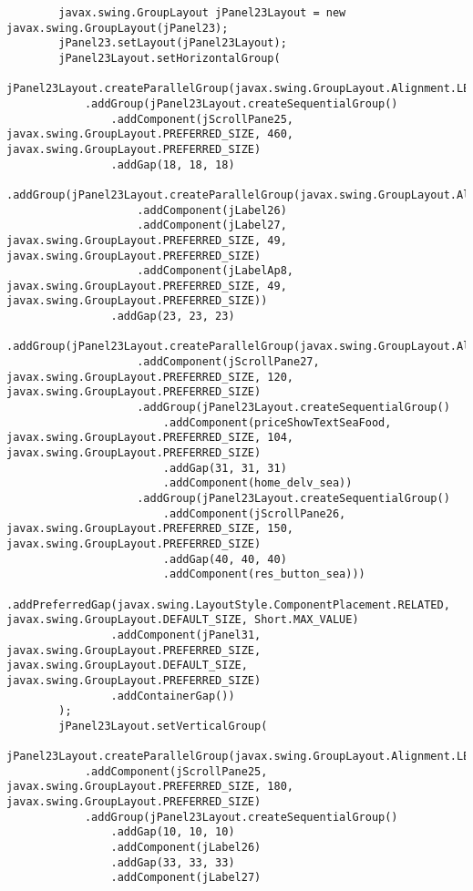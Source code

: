 \documentclass[12pt,a4paper]{article}
\begin{document}
\begin{lstlisting}
        javax.swing.GroupLayout jPanel23Layout = new javax.swing.GroupLayout(jPanel23);
        jPanel23.setLayout(jPanel23Layout);
        jPanel23Layout.setHorizontalGroup(
            jPanel23Layout.createParallelGroup(javax.swing.GroupLayout.Alignment.LEADING)
            .addGroup(jPanel23Layout.createSequentialGroup()
                .addComponent(jScrollPane25, javax.swing.GroupLayout.PREFERRED_SIZE, 460, javax.swing.GroupLayout.PREFERRED_SIZE)
                .addGap(18, 18, 18)
                .addGroup(jPanel23Layout.createParallelGroup(javax.swing.GroupLayout.Alignment.LEADING)
                    .addComponent(jLabel26)
                    .addComponent(jLabel27, javax.swing.GroupLayout.PREFERRED_SIZE, 49, javax.swing.GroupLayout.PREFERRED_SIZE)
                    .addComponent(jLabelAp8, javax.swing.GroupLayout.PREFERRED_SIZE, 49, javax.swing.GroupLayout.PREFERRED_SIZE))
                .addGap(23, 23, 23)
                .addGroup(jPanel23Layout.createParallelGroup(javax.swing.GroupLayout.Alignment.LEADING)
                    .addComponent(jScrollPane27, javax.swing.GroupLayout.PREFERRED_SIZE, 120, javax.swing.GroupLayout.PREFERRED_SIZE)
                    .addGroup(jPanel23Layout.createSequentialGroup()
                        .addComponent(priceShowTextSeaFood, javax.swing.GroupLayout.PREFERRED_SIZE, 104, javax.swing.GroupLayout.PREFERRED_SIZE)
                        .addGap(31, 31, 31)
                        .addComponent(home_delv_sea))
                    .addGroup(jPanel23Layout.createSequentialGroup()
                        .addComponent(jScrollPane26, javax.swing.GroupLayout.PREFERRED_SIZE, 150, javax.swing.GroupLayout.PREFERRED_SIZE)
                        .addGap(40, 40, 40)
                        .addComponent(res_button_sea)))
                .addPreferredGap(javax.swing.LayoutStyle.ComponentPlacement.RELATED, javax.swing.GroupLayout.DEFAULT_SIZE, Short.MAX_VALUE)
                .addComponent(jPanel31, javax.swing.GroupLayout.PREFERRED_SIZE, javax.swing.GroupLayout.DEFAULT_SIZE, javax.swing.GroupLayout.PREFERRED_SIZE)
                .addContainerGap())
        );
        jPanel23Layout.setVerticalGroup(
            jPanel23Layout.createParallelGroup(javax.swing.GroupLayout.Alignment.LEADING)
            .addComponent(jScrollPane25, javax.swing.GroupLayout.PREFERRED_SIZE, 180, javax.swing.GroupLayout.PREFERRED_SIZE)
            .addGroup(jPanel23Layout.createSequentialGroup()
                .addGap(10, 10, 10)
                .addComponent(jLabel26)
                .addGap(33, 33, 33)
                .addComponent(jLabel27)

\end{lstlisting}
\end{document}
